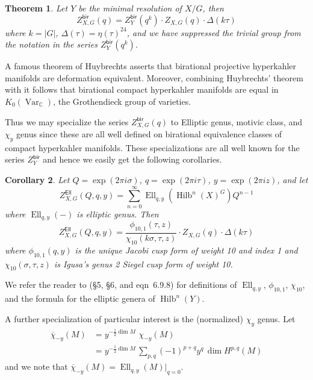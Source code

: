 \documentclass{amsart}
\newtheorem{theorem}{Theorem}[section]
\newtheorem{corollary}[theorem]{Corollary}
\theoremstyle{definition}
\newcommand{\half}{\frac{1}{2}}
\newcommand{\CC} {{\mathbb C}}          %
\newcommand{\bir}{\mathsf{bir}}
\newcommand{\Ell}{\mathsf{Ell}}
\newcommand{\Ellqy}{\operatorname{Ell}_{q,y}}
\newcommand{\chibar}{\overline{\chi}}
\newcommand{\Hilb}{\operatorname{Hilb}}
\begin{document}
\begin{theorem}\label{thm: Formula for Zbir}
Let $Y$ be the minimal resolution of $X/G$, then
\[
Z^{\bir}_{X,G} (q) = Z^{\bir}_{Y}(q^{k})\cdot Z_{X,G}(q)\cdot \Delta (k\tau )
\]
where $k=|G|$, $\Delta (\tau ) = \eta (\tau )^{24}$, and we have
suppressed the trivial group from the notation in the series
$Z^{\bir}_{Y}(q^{k})$.
\end{theorem}

A famous theorem of Huybrechts \cite[Thm~4.6]{Huybrechts} asserts that
birational projective hyperkahler manifolds are deformation
equivalent. Moreover, combining Huybrechts' theorem with
\cite[Prop~3.21]{Nicaise-Shinder} it follows that birational compact
hyperkahler manifolds are equal in $K_{0}(\operatorname{Var}_{\CC})$,
the Grothendieck group of varieties.

Thus we may specialize the series $Z^{\bir}_{X,G}(q)$ to Elliptic
genus, motivic class, and $\chi_{y}$ genus since these are all well
defined on birational equivalence classes of compact hyperkahler
manifolds. These specializations are all well known for the series
$Z^{\bir}_{Y}$ and hence we easily get the following corollaries.

\begin{corollary}\label{cor: Zell formula}
Let $Q=\exp\left(2\pi i\sigma \right)$, $q=\exp\left(2\pi i \tau 
\right)$, $y=\exp\left(2\pi i z
\right)$, and let
\[
Z^{\Ell}_{X,G}(Q,q,y) = \sum_{n=0}^{\infty} \Ellqy
\left(\Hilb^{n}(X)^{G} \right) Q^{n-1}
\]
where $\Ellqy (-)$ is elliptic genus. Then
\[
Z^{\Ell}_{X,G}(Q,q,y) = \frac{\phi_{10,1}(\tau  ,z)}{\chi_{10}(k\sigma
,\tau ,z)} \cdot Z_{X,G}(q)\cdot \Delta (k\tau )
\]
where $\phi_{10,1}(q ,y)$ is the unique Jacobi cusp form of weight
10 and index 1 and $\chi_{10}(\sigma ,\tau ,z)$ is Igusa's genus 2
Siegel cusp form of weight 10. 
\end{corollary}
We refer the reader to \cite{Pietromonaco_2018} (\S 5, \S 6, and
eqn~6.9.8) for definitions of $\Ellqy$, $\phi_{10,1}$, $\chi_{10}$,
and the formula for the elliptic genera of $\Hilb^{n}(Y)$.

A further specialization of particular interest is the (normalized)
$\chi_{y}$ genus. Let 
\begin{align*}
\chibar_{-y}(M) &= y^{-\half \dim
M}\,\, \chi_{-y}(M)\\
& =  y^{-\half \dim
M} \,\sum_{p,q} (-1)^{p+q} y^{q} \, \dim H^{p,q}(M)
\end{align*}
and we note that $\chibar_{-y}(M) = \Ellqy
(M)|_{q=0}$.
\end{document}
